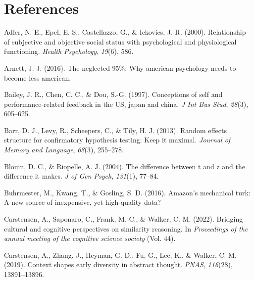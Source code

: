 \documentclass[
  man,floatsintext]{apa6}
\newlength{\cslhangindent}
\newlength{\cslentryspacingunit} %
\newenvironment{CSLReferences}[2] %
 {%
  \setlength{\parindent}{0pt}
  \ifodd #1
  \let\oldpar\par
  \def\par{\hangindent=\cslhangindent\oldpar}
  \fi
  \setlength{\parskip}{#2\cslentryspacingunit}
 }%
 {}
\begin{document}
\setlength{\parindent}{-0.5in}
\setlength{\leftskip}{0.5in}

\newpage

\hypertarget{references}{%
\section{References}\label{references}}

\hypertarget{refs}{}
\begin{CSLReferences}{1}{0}
\leavevmode{}%
Adler, N. E., Epel, E. S., Castellazzo, G., \& Ickovics, J. R. (2000). Relationship of subjective and objective social status with psychological and physiological functioning. \emph{Health Psychology}, \emph{19}(6), 586.

\leavevmode{}%
Arnett, J. J. (2016). The neglected 95\%: Why american psychology needs to become less american.

\leavevmode{}%
Bailey, J. R., Chen, C. C., \& Dou, S.-G. (1997). Conceptions of self and performance-related feedback in the US, japan and china. \emph{J Int Bus Stud}, \emph{28}(3), 605--625.

\leavevmode{}%
Barr, D. J., Levy, R., Scheepers, C., \& Tily, H. J. (2013). Random effects structure for confirmatory hypothesis testing: Keep it maximal. \emph{Journal of Memory and Language}, \emph{68}(3), 255--278.

\leavevmode{}%
Blouin, D. C., \& Riopelle, A. J. (2004). The difference between t and z and the difference it makes. \emph{J of Gen Psych}, \emph{131}(1), 77--84.

\leavevmode{}%
Buhrmester, M., Kwang, T., \& Gosling, S. D. (2016). Amazon's mechanical turk: A new source of inexpensive, yet high-quality data?

\leavevmode{}%
Carstensen, A., Saponaro, C., Frank, M. C., \& Walker, C. M. (2022). Bridging cultural and cognitive perspectives on similarity reasoning. In \emph{Proceedings of the annual meeting of the cognitive science society} (Vol. 44).

\leavevmode{}%
Carstensen, A., Zhang, J., Heyman, G. D., Fu, G., Lee, K., \& Walker, C. M. (2019). Context shapes early diversity in abstract thought. \emph{PNAS}, \emph{116}(28), 13891--13896.


\end{CSLReferences}
\end{document}
